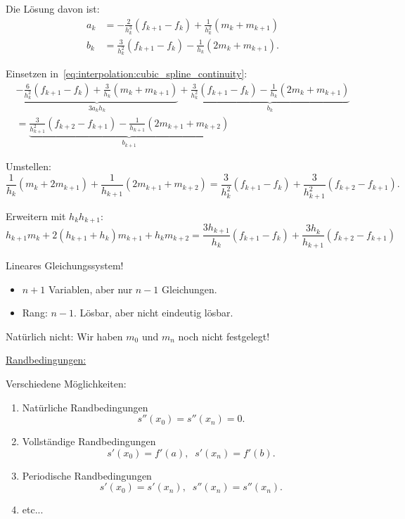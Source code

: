 Die Lösung davon ist:
\begin{align*}
 a_k & = - \frac{2}{h_k^3}(f_{k+1} - f_k) + \frac{1}{h_k^2}(m_k + m_{k+1}) \\
 b_k & = \frac{3}{h_k^2}(f_{k+1} - f_k) - \frac{1}{h_k}(2m_k + m_{k+1}).
\end{align*}

Einsetzen in~\eqref{eq:interpolation:cubic_spline_continuity}:
\begin{multline*}
 \underbrace{-\frac{6}{h_k^2}(f_{k+1} - f_k) + \frac{3}{h_k}(m_k + m_{k+1})}_{3a_kh_k}
  + \underbrace{\frac{3}{h_k^2}(f_{k+1} - f_k) - \frac{1}{h_k}(2m_k + m_{k+1})}_{b_k}\\
 =
 \underbrace{\frac{3}{h^2_{k+1}}(f_{k+2} - f_{k+1}) - \frac{1}{h_{k+1}}(2m_{k+1} + m_{k+2})}_{b_{k+1}}
\end{multline*}

Umstellen:
\begin{equation*}
 \frac{1}{h_k}(m_k + 2m_{k+1}) + \frac{1}{h_{k+1}}(2m_{k+1} + m_{k+2})
 =
 \frac{3}{h_k^2}(f_{k+1} - f_k) + \frac{3}{h^2_{k+1}}(f_{k+2} - f_{k+1}).
\end{equation*}

Erweitern mit $h_k h_{k+1}$:
\begin{equation*}
 h_{k+1}m_k + 2(h_{k+1}+h_k)m_{k+1} + h_km_{k+2}
 =
 \frac{3h_{k+1}}{h_k}(f_{k+1} - f_k) + \frac{3h_k}{h_{k+1}}(f_{k+2} - f_{k+1})
\end{equation*}

Lineares Gleichungssystem!
\begin{itemize}
  \item $n+1$ Variablen, aber nur $n-1$ Gleichungen.
  \item Rang: $n-1$. Lösbar, aber nicht eindeutig lösbar.
\end{itemize}

Natürlich nicht: Wir haben $m_0$ und $m_n$ noch nicht festgelegt!

\bigskip

\underline{Randbedingungen:}

Verschiedene Möglichkeiten:
\begin{enumerate}
  \item Natürliche Randbedingungen
   \begin{equation*}
    s''(x_0) = s''(x_n) = 0.
   \end{equation*}

  \item Vollständige Randbedingungen
   \begin{equation*}
    s'(x_0) = f'(a), \;\; s'(x_n) = f'(b).
   \end{equation*}

  \item Periodische Randbedingungen
   \begin{equation*}
    s'(x_0) = s'(x_n), \;\; s''(x_n) = s''(x_n).
   \end{equation*}
  \item etc...
\end{enumerate}

